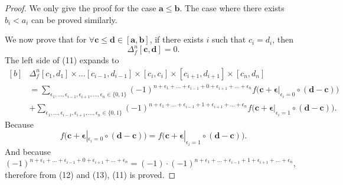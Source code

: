 \documentclass{ijclclp}
\begin{document}
\begin{proof}
    We only give the proof for the case \(\boldsymbol{a}\leq\boldsymbol{b}\). The case where there exists \(b_i<a_i\) can be proved similarly. 

    
    We now prove that for \(\forall\boldsymbol{c}\leq\boldsymbol{d}\in[\boldsymbol{a},\boldsymbol{b}]\), if there exists \(i\) such that \(c_i=d_i\), then
    \begin{equation}
        \Delta_{f}^n[\boldsymbol{c},\boldsymbol{d}]=0.
    \end{equation}
    The left side of (11) expands to
    \begin{equation}
        \begin{aligned}[b]
        &\Delta_{f}^n[c_1,d_1]\times\dots[c_{i-1},d_{i-1}]\times[c_i,c_i]\times[c_{i+1},d_{i+1}]\times[c_n,d_n]\\
        &=\sum_{\epsilon_1,\dots,\epsilon_{i-1},\epsilon_{i+1},\dots,\epsilon_n\in\{0,1\}}(-1)^{n+\epsilon_1+\dots+\epsilon_{i-1}+0+\epsilon_{i+1}+\dots+\epsilon_n}f\big(\boldsymbol{c}+\boldsymbol{\epsilon}|_{\epsilon_i=0}\circ(\boldsymbol{d}-\boldsymbol{c})\big)\\
        &+\sum_{\epsilon_1,\dots,\epsilon_{i-1},\epsilon_{i+1},\dots,\epsilon_n\in\{0,1\}}(-1)^{n+\epsilon_1+\dots+\epsilon_{i-1}+1+\epsilon_{i+1}+\dots+\epsilon_n}f\big(\boldsymbol{c}+\boldsymbol{\epsilon}|_{\epsilon_i=1}\circ(\boldsymbol{d}-\boldsymbol{c})\big).
        \end{aligned}
    \end{equation}
    Because
    \begin{equation}
        f\big(\boldsymbol{c}+\boldsymbol{\epsilon}|_{\epsilon_i=0}\circ(\boldsymbol{d}-\boldsymbol{c})\big)=f\big(\boldsymbol{c}+\boldsymbol{\epsilon}|_{\epsilon_i=1}\circ(\boldsymbol{d}-\boldsymbol{c})\big).
    \end{equation}
    And because\((-1)^{n+\epsilon_1+\dots+\epsilon_{i-1}+0+\epsilon_{i+1}+\dots+\epsilon_n}=(-1)\cdot(-1)^{n+\epsilon_1+\dots+\epsilon_{i-1}+1+\epsilon_{i+1}+\dots+\epsilon_n}\), 
    therefore from (12) and (13), (11) is proved.
    

\end{proof}
\end{document}
